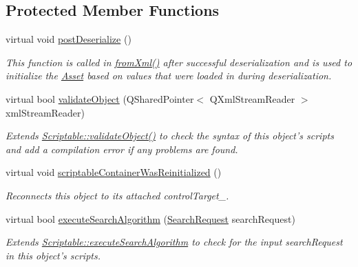 \subsection*{Protected Member Functions}
\begin{DoxyCompactItemize}
\item 
virtual void \hyperlink{class_picto_1_1_target_controller_a47559ed2d4c00422a3fc84e80620f4fc}{post\-Deserialize} ()
\begin{DoxyCompactList}\small\item\em This function is called in \hyperlink{class_picto_1_1_asset_a8bed4da09ecb1c07ce0dab313a9aba67}{from\-Xml()} after successful deserialization and is used to initialize the \hyperlink{class_picto_1_1_asset}{Asset} based on values that were loaded in during deserialization. \end{DoxyCompactList}\item 
\hypertarget{class_picto_1_1_target_controller_ad8cc347e220989bc087de49e64efa18a}{virtual bool \hyperlink{class_picto_1_1_target_controller_ad8cc347e220989bc087de49e64efa18a}{validate\-Object} (Q\-Shared\-Pointer$<$ Q\-Xml\-Stream\-Reader $>$ xml\-Stream\-Reader)}\label{class_picto_1_1_target_controller_ad8cc347e220989bc087de49e64efa18a}

\begin{DoxyCompactList}\small\item\em Extends \hyperlink{class_picto_1_1_scriptable_ab6e2944c43a3b5d418bf7b251594386d}{Scriptable\-::validate\-Object()} to check the syntax of this object's scripts and add a compilation error if any problems are found. \end{DoxyCompactList}\item 
virtual void \hyperlink{class_picto_1_1_target_controller_ac08fbeabffadf7986a02bd422ad03cbc}{scriptable\-Container\-Was\-Reinitialized} ()
\begin{DoxyCompactList}\small\item\em Reconnects this object to its attached control\-Target\-\_\-. \end{DoxyCompactList}\item 
\hypertarget{class_picto_1_1_target_controller_a3682e73fcec2b68a7dbd45ad892cc824}{virtual bool \hyperlink{class_picto_1_1_target_controller_a3682e73fcec2b68a7dbd45ad892cc824}{execute\-Search\-Algorithm} (\hyperlink{struct_search_request}{Search\-Request} search\-Request)}\label{class_picto_1_1_target_controller_a3682e73fcec2b68a7dbd45ad892cc824}

\begin{DoxyCompactList}\small\item\em Extends \hyperlink{class_picto_1_1_u_i_enabled_a97cb540bf9702a5af91a9eeddde39db9}{Scriptable\-::execute\-Search\-Algorithm} to check for the input search\-Request in this object's scripts. \end{DoxyCompactList}\end{DoxyCompactItemize}
